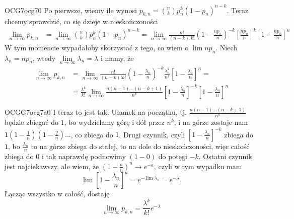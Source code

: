 \documentclass{article}
\begin{document}
\begin{ocg}{OCG7}{ocg7}{0}
Po pierwsze, wiemy ile wynosi $p_{k,n}={n\choose k}p_n^{k}(1-p_n)^{n-k}$. Teraz chcemy sprawdzić, co się dzieje w nieskończoności
\begin{align*}
    \lim\limits_{n\to\infty}p_{k,n}&=\lim\limits_{n\to\infty}{n\choose k}p_n^{k}(1-p_n)^{n-k}=\lim\limits_{n\to\infty}\frac{n!}{(n-k)!k!}(1-\frac{np_n}{n})^{-k}\left[\frac{np_n}{n}\right]^{k}\left[1-\frac{np_n}{n}\right]^n
\end{align*}
W tym momencie wypadałoby skorzystać z tego, co wiem o $\lim np_n$. Niech $\lambda_n=np_n$, wtedy $\lim\limits_{n\to\infty}\lambda_n=\lambda$ i mamy, że
\begin{align*}
    \lim\limits_{n\to\infty}p_{k,n}&=\lim\limits_{n\to\infty}\frac{n!}{(n-k)!k!}(1-\frac{\lambda_n}{n})^{-k}\frac{\lambda_n^k}{n^k}\left[1-\frac{\lambda_n}{n}\right]^n=\\
    &=\frac{\lambda^k}{k!}\lim\limits_{n\to\infty}\frac{n(n-1)...(n-k+1)}{n^k}\left[1-\frac{\lambda_n}{n}\right]^{-k}\left[1-\frac{\lambda_n}{n}\right]^n
\end{align*}
\end{ocg}


\begin{ocg}{OCGG7}{ocg7a}{0}
I teraz to jest tak. Ułamek na początku, tj. $\frac{n(n-1)...(n-k+1)}{n^k}$ będzie zbiegać do $1$, bo wydzielamy górę i dół przez $n^k$, i na górze zostaje nam $1(1-\frac1n)(1-\frac2n)...$, co zbiega do $1$. Drugi czynnik, czyli $\left[1-\frac{\lambda_n}{n}\right]^{-k}$ zbiega do $1$, bo $\frac{\lambda_n}{n}$ to na górze zbiega do stałej, to na dole do nieskończoności, więc całość zbiega do $0$ i tak naprawdę podnowimy $(1-0)$ do potęgi $-k$. Ostatni czynnik jest najciekawszy, ale wiem, że $(1-\frac{a}{n})^n\to e^{-a}$, czyli w tym wypadku mam
$$\lim\left[1-\frac{\lambda_n}{n}\right]^n=e^{-\lim\lambda_n}=e^{-\lambda}.$$
Łącząc wszystko w całość, dostaję
$$\lim\limits_{n\to\infty}p_{k,n}=\frac{\lambda^k}{k!}e^{-\lambda}$$
\end{ocg}


\end{document}

